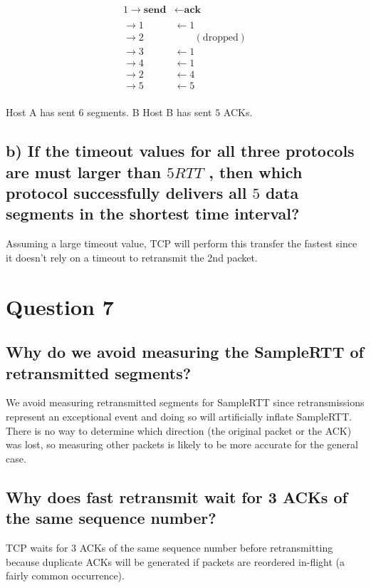 \documentclass[12pt]{article}
\begin{document}
\begin{alignat*}{1}
\to \textbf{send} & \leftarrow \textbf{ack} \\ \\
\to 1 & \leftarrow 1 \\
\to 2 & \qquad (\text{dropped}) \\
\to 3 & \leftarrow 1 \\
\to 4 & \leftarrow 1 \\
\to 2 & \leftarrow 4 \\
\to 5 & \leftarrow 5 \\
\end{alignat*}

Host A has sent $6$ segments. B Host B has sent $5$ ACKs.

\subsection*{b) If the timeout values for all three protocols are must larger than $5 {RTT}$ , then which protocol successfully delivers all $5$ data segments in the shortest time interval?}

Assuming a large timeout value, TCP will perform this transfer the fastest since it doesn't rely on a timeout to retransmit the 2nd packet.

\section*{Question 7}

\subsection*{Why do we avoid measuring the SampleRTT of retransmitted segments?}

We avoid measuring retransmitted segments for SampleRTT since retransmissions represent an exceptional event and doing so will artificially inflate SampleRTT. There is no way to determine which direction (the original packet or the ACK) was lost, so measuring other packets is likely to be more accurate for the general case.

\subsection*{Why does fast retransmit wait for 3 ACKs of the same sequence number?}

TCP waits for 3 ACKs of the same sequence number before retransmitting because duplicate ACKs will be generated if packets are reordered in-flight (a fairly common occurrence).
\end{document}
